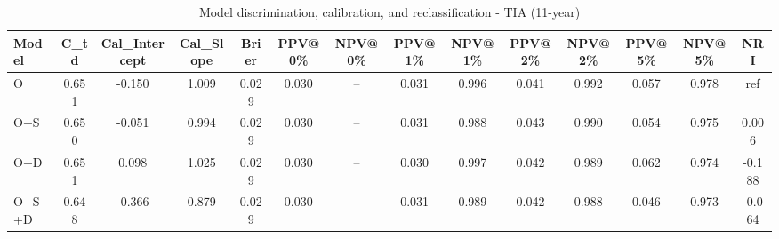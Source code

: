 \begin{table}[htbp]
\centering
\small
\caption{Model discrimination, calibration, and reclassification - TIA (11-year)}
\label{tab:perf_tia_11y}
\begin{tabular}{lccccccccccccc}
\toprule
Model & C\_td & Cal\_Intercept & Cal\_Slope & Brier & PPV@0\% & NPV@0\% & PPV@1\% & NPV@1\% & PPV@2\% & NPV@2\% & PPV@5\% & NPV@5\% & NRI \\
\midrule
O & 0.651 & -0.150 & 1.009 & 0.029 & 0.030 & -- & 0.031 & 0.996 & 0.041 & 0.992 & 0.057 & 0.978 & ref \\
O+S & 0.650 & -0.051 & 0.994 & 0.029 & 0.030 & -- & 0.031 & 0.988 & 0.043 & 0.990 & 0.054 & 0.975 & 0.006 \\
O+D & 0.651 & 0.098 & 1.025 & 0.029 & 0.030 & -- & 0.030 & 0.997 & 0.042 & 0.989 & 0.062 & 0.974 & -0.188 \\
O+S+D & 0.648 & -0.366 & 0.879 & 0.029 & 0.030 & -- & 0.031 & 0.989 & 0.042 & 0.988 & 0.046 & 0.973 & -0.064 \\
\bottomrule
\end{tabular}
\end{table}